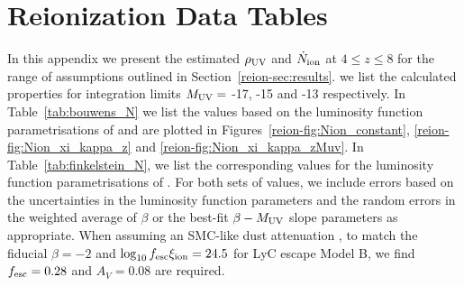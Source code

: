 \chapter{Reionization Data Tables}\label{app:tables}
In this appendix we present the estimated $\rho_{\rm{UV}}$ and $\dot{N}_{\rm{ion}}$ at $4 \leq z \leq 8$ for the range of assumptions outlined in Section~\ref{reion-sec:results}.  we list the calculated properties for integration limits $M_{\rm{UV}} =$ -17, -15 and -13 respectively. In Table~\ref{tab:bouwens_N} we list the values based on the luminosity function parametrisations of \citet{2015ApJ...803...34B} and are plotted in Figures~\ref{reion-fig:Nion_constant}, \ref{reion-fig:Nion_xi_kappa_z} and \ref{reion-fig:Nion_xi_kappa_zMuv}. In Table~\ref{tab:finkelstein_N}, we list the corresponding values for the luminosity function parametrisations of \citet{Finkelstein:2014ub}.
For both sets of values, we include errors based on the uncertainties in the luminosity function parameters and the random errors in the weighted average of $\beta$ or the best-fit $\beta-M_{\rm{UV}}$ slope parameters \citep{Bouwens:2013vf} as appropriate. When assuming an SMC-like dust attenuation \citep{Pei:1992ey}, to match the fiducial $\beta = -2$ and $\log_{10}f_{\rm{esc}} \xi_{\rm{ion}}=24.5$ for LyC escape Model B, we find $f_{\rm{esc}} = 0.28$ and $A_{V} = 0.08$ are required. 

